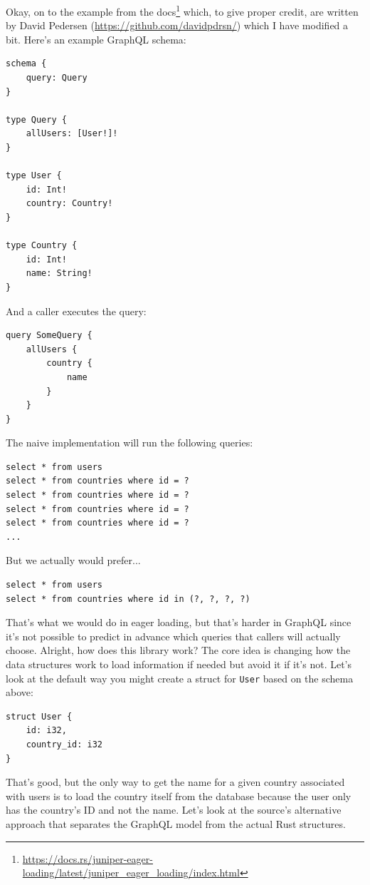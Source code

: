 Okay, on to the example from the docs\footnote{\url{https://docs.rs/juniper-eager-loading/latest/juniper_eager_loading/index.html}} which, to give proper credit, are written by David Pedersen (\url{https://github.com/davidpdrsn/}) which I have modified a bit. Here's an example GraphQL schema:

\begin{lstlisting}
schema {
    query: Query
}

type Query {
    allUsers: [User!]!
}

type User {
    id: Int!
    country: Country!
}

type Country {
    id: Int!
    name: String!
}
\end{lstlisting}

And a caller executes the query:
\begin{lstlisting}
query SomeQuery {
    allUsers {
        country {
            name
        }
    }
}
\end{lstlisting}

The naive implementation will run the following queries:
\begin{lstlisting}
select * from users
select * from countries where id = ?
select * from countries where id = ?
select * from countries where id = ?
select * from countries where id = ?
...
\end{lstlisting}

But we actually would prefer...
\begin{lstlisting}
select * from users
select * from countries where id in (?, ?, ?, ?)
\end{lstlisting}

That's what we would do in eager loading, but that's harder in GraphQL since it's not possible to predict in advance which queries that callers will actually choose. Alright, how does this library work? The core idea is changing how the data structures work to load information if needed but avoid it if it's not. Let's look at the default way you might create a struct for \texttt{User} based on the schema above:

\begin{lstlisting}
struct User {
    id: i32,
    country_id: i32
}
\end{lstlisting}
That's good, but the only way to get the name for a given country associated with users is to load the country itself from the database because the user only has the country's ID and not the name. Let's look at the source's alternative approach that separates the GraphQL model from the actual Rust structures.

